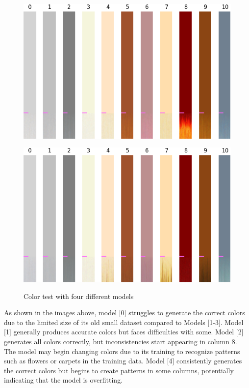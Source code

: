\begin{itemize}
\begin{figure}[H]
            \begin{minipage}{0.45\textwidth}
                \centering
                \includegraphics[width=\textwidth]{imgs/ColorTest_2.1.8.1_256.png} 
                \label{fig:test1_M2_Cit}
            \end{minipage}
            \hfill
            \begin{minipage}{0.45\textwidth}
                \centering
                \includegraphics[width=\textwidth]{imgs/ColorTest_2.1.8.1_512.png} 
                \label{fig:test1_M3_Cit}
            \end{minipage}
            \caption{Color test with four different models}
        \end{figure}
    
        As shown in the images above, model [0] struggles to generate the correct colors due to the limited size of its old small dataset compared to Models [1-3]. Model [1] generally produces accurate colors but faces difficulties with some. Model [2] generates all colors correctly, but inconsistencies start appearing in column 8. The model may begin changing colors due to its training to recognize patterns such as flowers or carpets in the training data. Model [4] consistently generates the correct colors but begins to create patterns in some columns, potentially indicating that the model is overfitting.
 

\end{itemize}
